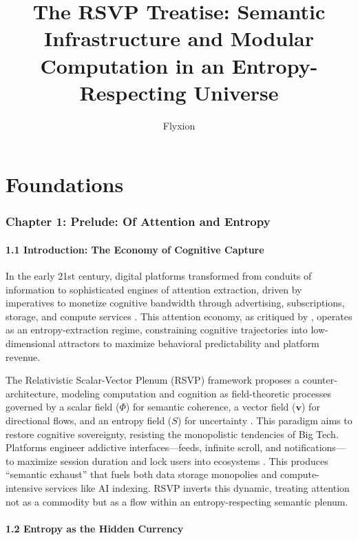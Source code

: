 \documentclass[12pt]{article}
\title{The RSVP Treatise: Semantic Infrastructure and Modular Computation in an Entropy-Respecting Universe}
\author{Flyxion}
\date{}
\begin{document}
\maketitle

\tableofcontents

\part{Foundations}

\section*{Chapter 1: Prelude: Of Attention and Entropy}

\subsection*{1.1 Introduction: The Economy of Cognitive Capture}

In the early 21st century, digital platforms transformed from conduits of information to sophisticated engines of attention extraction, driven by imperatives to monetize cognitive bandwidth through advertising, subscriptions, storage, and compute services \citep{zuboff2019}. This attention economy, as critiqued by \citet{lanier2018}, operates as an entropy-extraction regime, constraining cognitive trajectories into low-dimensional attractors to maximize behavioral predictability and platform revenue.

The Relativistic Scalar-Vector Plenum (RSVP) framework proposes a counter-architecture, modeling computation and cognition as field-theoretic processes governed by a scalar field (\(\Phi\)) for semantic coherence, a vector field (\(\mathbf{v}\)) for directional flows, and an entropy field (\(S\)) for uncertainty \citep{shannon1948, jaynes2003}. This paradigm aims to restore cognitive sovereignty, resisting the monopolistic tendencies of Big Tech. Platforms engineer addictive interfaces—feeds, infinite scroll, and notifications—to maximize session duration and lock users into ecosystems \citep{zuboff2019}. This produces “semantic exhaust” that fuels both data storage monopolies and compute-intensive services like AI indexing. RSVP inverts this dynamic, treating attention not as a commodity but as a flow within an entropy-respecting semantic plenum.

\subsection*{1.2 Entropy as the Hidden Currency}
\end{document}
